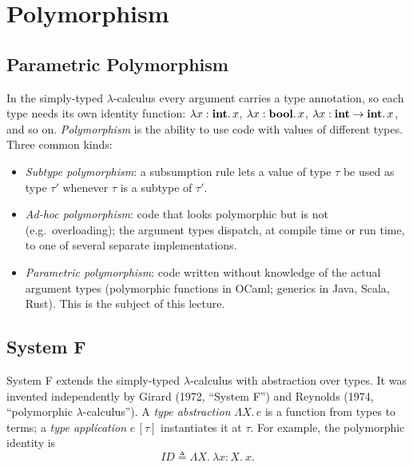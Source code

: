 % 
\chapter{Polymorphism}

\section{Parametric Polymorphism}

In the simply-typed $\lambda$-calculus every argument carries a type annotation,
so each type needs its own identity function: $\lambda x : \mathbf{int}.\, x$,
$\lambda x : \mathbf{bool}.\, x$, $\lambda x : \mathbf{int} \to \mathbf{int}.\, x$, and so on.
\emph{Polymorphism} is the ability to use code with values of different types.
Three common kinds:
\begin{itemize}
  \item \emph{Subtype polymorphism}: a subsumption rule lets a value of type
        $\tau$ be used as type $\tau'$ whenever $\tau$ is a subtype of $\tau'$.
  \item \emph{Ad-hoc polymorphism}: code that looks polymorphic but is not
        (e.g.\ overloading); the argument types dispatch, at compile time or run
        time, to one of several separate implementations.
  \item \emph{Parametric polymorphism}: code written without knowledge of the
        actual argument types (polymorphic functions in OCaml; generics in Java,
        Scala, Rust). This is the subject of this lecture.
\end{itemize}

\section{System F}

System F extends the simply-typed $\lambda$-calculus with abstraction over types.
It was invented independently by Girard (1972, ``System F'') and Reynolds (1974,
``polymorphic $\lambda$-calculus''). A \emph{type abstraction} $\Lambda X.\, e$ is
a function from types to terms; a \emph{type application} $e\,[\tau]$ instantiates
it at $\tau$. For example, the polymorphic identity is
\[
\mathit{ID} \triangleq \Lambda X.\ \lambda x : X.\ x.
\]

